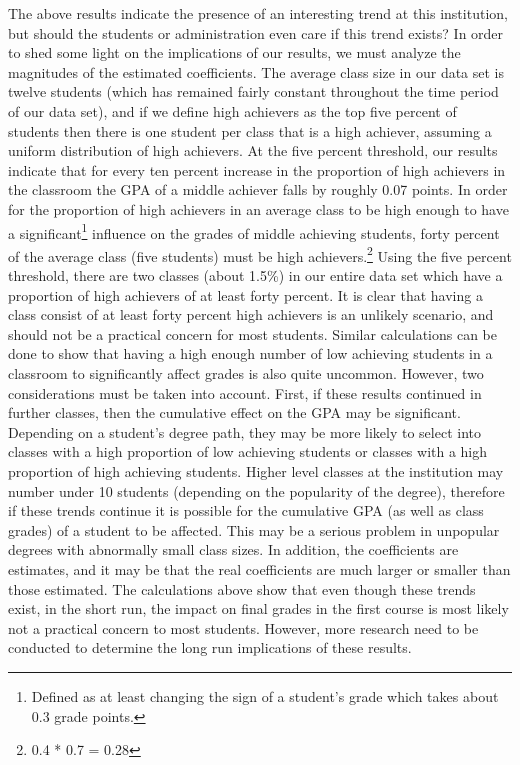 The above results indicate the presence of an interesting trend at this institution, but should the students or administration even care if this trend exists? In order to shed some light on the implications of our results, we must analyze the magnitudes of the estimated coefficients. 
The average class size in our data set is twelve students (which has remained fairly constant throughout the time period of our data set), and if we define high achievers as the top five percent of students then there is one student per class that is a high achiever,  assuming a uniform distribution of high achievers. 
At the five percent threshold, our results indicate that for every ten percent increase in the proportion of high achievers in the classroom the GPA of a middle achiever falls by roughly 0.07 points. 
In order for the proportion of high achievers in an average class to be high enough to have a significant\footnote{Defined as at least changing the sign of a student's grade which takes about 0.3 grade points.} influence on the grades of middle achieving students, forty percent of the average class (five students) must be high achievers.\footnote{0.4 * 0.7 = 0.28} Using the five percent threshold, there are two classes (about 1.5\%) in our entire data set which have a proportion of high achievers of at least forty percent. 
It is clear that having a class consist of at least forty percent high achievers is an unlikely scenario, and should not be a practical concern for most students. 
Similar calculations can be done to show that having a high enough number of low achieving students in a classroom to significantly affect grades is also quite uncommon. 
However, two considerations must be taken into account. 
First, if these results continued in further classes, then the cumulative effect on the GPA may be significant. 
Depending on a student's degree path, they may be more likely to select into classes with a high proportion of low achieving students or classes with a high proportion of high achieving students. 
Higher level classes at the institution may number under 10 students (depending on the popularity of the degree), therefore if these trends continue it is possible for the cumulative GPA (as well as class grades) of a student to be affected. 
This may be a serious problem in unpopular degrees with abnormally small class sizes. 
In addition, the coefficients are estimates, and it may be that the real coefficients are much larger or smaller than those estimated. 
The calculations above show that even though these trends exist, in the short run, the impact on final grades in the first course is most likely not a practical concern to most students. 
However, more research need to be conducted to determine the long run implications of these results. 

